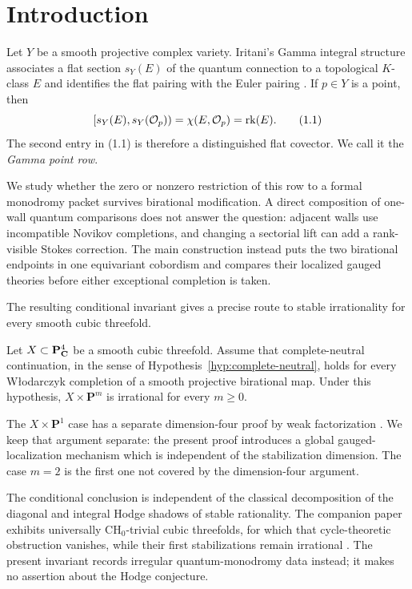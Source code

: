 \section{Introduction}\label{sec:introduction}

Let \(Y\) be a smooth projective complex variety.  Iritani's Gamma integral
structure associates a flat section \(s_Y(E)\) of the quantum connection to a
topological \(K\)-class \(E\) and identifies the flat pairing with the Euler
pairing \cite{IritaniGamma}.  If \(p\in Y\) is a point, then
\[
 [s_Y(E),s_Y(\mathcal O_p))=\chi(E,\mathcal O_p)=\operatorname{rk}(E).              \tag{1.1}
\]
The second entry in (1.1) is therefore a distinguished flat covector.  We
call it the \emph{Gamma point row}.

We study whether the zero or nonzero restriction of this row to a formal
monodromy packet survives birational modification.  A direct composition of
one-wall quantum comparisons does not answer the question: adjacent walls
use incompatible Novikov completions, and changing a sectorial lift can add
a rank-visible Stokes correction.  The main construction instead puts the
two birational endpoints in one equivariant cobordism and compares their
localized gauged theories before either exceptional completion is taken.

The resulting conditional invariant gives a precise route to stable
irrationality for every smooth cubic threefold.

\begin{theorem}
\label{thm:intro-cubic-conditional}
Let \(X\subset\mathbf P^4_{\mathbf C}\) be a smooth cubic threefold.  Assume that
complete-neutral continuation, in the sense of
Hypothesis~\ref{hyp:complete-neutral}, holds for every W{\l}odarczyk
completion of a smooth projective birational map.  Under this hypothesis,
\(X\times\mathbf P^m\) is irrational for every \(m\geq0\).
\end{theorem}

The \(X\times\mathbf P^1\) case has a separate
dimension-four proof by weak factorization \cite{RuddEpilogue}.  We keep that
argument separate: the present proof introduces a global gauged-localization
mechanism which is independent of the stabilization dimension.  The case
\(m=2\) is the first one not covered by the dimension-four argument.

The conditional conclusion is independent of the classical decomposition of
the diagonal and integral Hodge shadows of stable rationality.  The companion paper
exhibits universally \(\mathrm{CH}_0\)-trivial cubic threefolds, for which that
cycle-theoretic obstruction vanishes, while their first stabilizations remain
irrational \cite{RuddEpilogue}.  The present invariant records irregular
quantum-monodromy data instead; it makes no assertion about the Hodge
conjecture.

